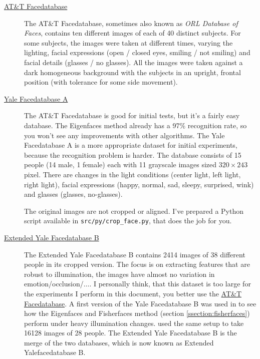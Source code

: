 \begin{description}

	\item[\href{http://www.cl.cam.ac.uk/research/dtg/attarchive/facedatabase.html}{AT\&T Facedatabase}] The AT\&T Facedatabase, sometimes also known as \textit{ORL Database of Faces}, contains ten different images of each of 40 distinct subjects. For some subjects, the images were taken at different times, varying the lighting, facial expressions (open / closed eyes, smiling / not smiling) and facial details (glasses / no glasses). All the images were taken against a dark homogeneous background with the subjects in an upright, frontal position (with tolerance for some side movement).
	
	\item[\href{http://vision.ucsd.edu/content/yale-face-database}{Yale Facedatabase A}] The AT\&T Facedatabase is good for initial tests, but it's a fairly easy database. The Eigenfaces method already has a 97\% recognition rate, so you won't see any improvements with other algorithms. The Yale Facedatabase A is a more appropriate dataset for initial experiments, because the recognition problem is harder. The database consists of 15 people (14 male, 1 female) each with 11 grayscale images sized $320 \times 243$ pixel. There are changes in the light conditions (center light, left light, right light), facial expressions (happy, normal, sad, sleepy, surprised, wink) and glasses (glasses, no-glasses). 
	
The original images are not cropped or aligned. I've prepared a Python script available in \lstinline|src/py/crop_face.py|, that does the job for you.
	
	\item[\href{http://vision.ucsd.edu/~leekc/ExtYaleDatabase/ExtYaleB.html}{Extended Yale Facedatabase B}] The Extended Yale Facedatabase B contains 2414 images of 38 different people in its cropped version. The focus is on extracting features that are robust to illumination, the images have almost no variation in emotion/occlusion/$\ldots$. I personally think, that this dataset is too large for the experiments I perform in this document, you better use the \href{http://www.cl.cam.ac.uk/research/dtg/attarchive/facedatabase.html}{AT\&T Facedatabase}. A first version of the Yale Facedatabase B was used in \cite{belhumeru97} to see how the Eigenfaces and Fisherfaces method (section \ref{ssection:fisherfaces}) perform under heavy illumination changes. \cite{Lee2005} used the same setup to take 16128 images of 28 people. The Extended Yale Facedatabase B is the merge of the two databases, which is now known as Extended Yalefacedatabase B.

\end{description}

